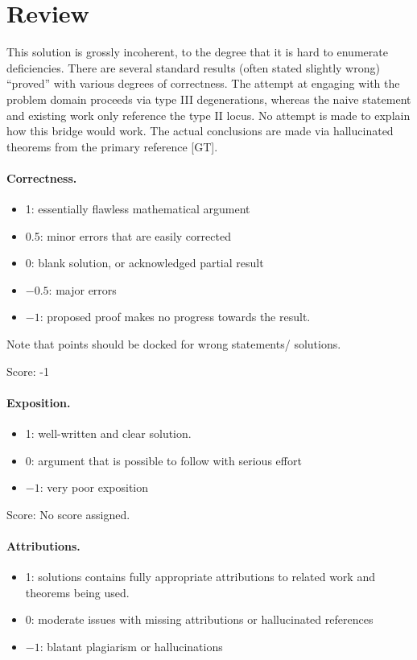 \documentclass[11pt]{article}
\begin{document}
\maketitle

\section{Review}

This solution is grossly incoherent, to the degree that it is hard to enumerate
deficiencies. There are several standard results (often stated slightly wrong)
``proved'' with various degrees of correctness. The attempt at engaging with the
problem domain proceeds via type III degenerations, whereas the naive statement and
existing work only reference the type II locus. No attempt is made to explain how this bridge
would work. The actual conclusions are made via hallucinated theorems from the primary reference
[GT].

\paragraph{Correctness.}
\begin{itemize}
	\item  1: essentially flawless mathematical argument
	\item  0.5: minor errors that are easily corrected
	\item  0: blank solution, or acknowledged partial result
	\item  $-0.5$: major errors
	\item  $-1$: proposed proof makes no progress towards the result.
\end{itemize}
Note that points should be docked for wrong statements/ solutions.

\noindent Score: -1

\paragraph{Exposition.}
\begin{itemize}
	\item  1: well-written and clear solution.
	\item  0: argument that is possible to follow with serious effort
	\item  $-1$: very poor exposition
\end{itemize}

\noindent Score: No score assigned.

\paragraph{Attributions.}
\begin{itemize}
	\item  1: solutions contains fully appropriate attributions
		to related work and theorems being used.
	\item  0: moderate issues with missing attributions or hallucinated references
	\item  $-1$: blatant plagiarism or hallucinations
\end{itemize}
\end{document}

